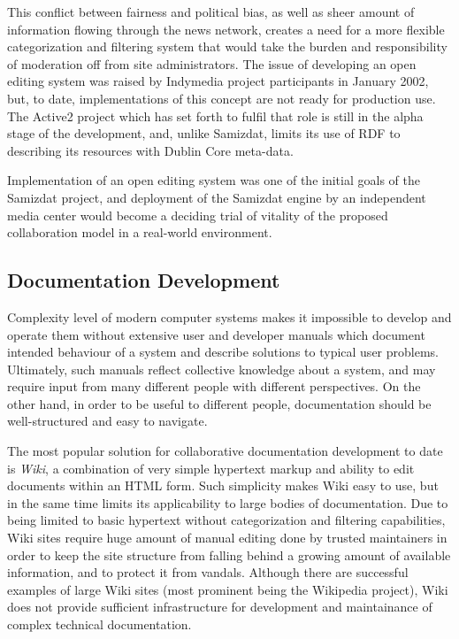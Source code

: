 \documentclass{llncs}
\begin{document}
This conflict between fairness and political bias, as well as sheer amount of
information flowing through the news network, creates a need for a more
flexible categorization and filtering system that would take the burden and
responsibility of moderation off from site administrators. The issue of
developing an open editing system was raised by Indymedia project participants
in January 2002, but, to date, implementations of this concept are not ready
for production use. The Active2 project\cite{active2} which has set forth to
fulfil that role is still in the alpha stage of the development, and, unlike
Samizdat, limits its use of RDF to describing its resources with Dublin Core
meta-data.

Implementation of an open editing system was one of the initial goals of the
Samizdat project\cite{oscom3}, and deployment of the Samizdat engine by an
independent media center would become a deciding trial of vitality of the
proposed collaboration model in a real-world environment.

\subsection{Documentation Development}

Complexity level of modern computer systems makes it impossible to develop and
operate them without extensive user and developer manuals which document
intended behaviour of a system and describe solutions to typical user
problems. Ultimately, such manuals reflect collective knowledge about a
system, and may require input from many different people with different
perspectives. On the other hand, in order to be useful to different people,
documentation should be well-structured and easy to navigate.

The most popular solution for collaborative documentation development to date
is \emph{Wiki}, a combination of very simple hypertext markup and ability to
edit documents within an HTML form. Such simplicity makes Wiki easy to use,
but in the same time limits its applicability to large bodies of
documentation. Due to being limited to basic hypertext without categorization
and filtering capabilities, Wiki sites require huge amount of manual editing
done by trusted maintainers in order to keep the site structure from falling
behind a growing amount of available information, and to protect it from
vandals. Although there are successful examples of large Wiki sites (most
prominent being the Wikipedia project), Wiki does not provide sufficient
infrastructure for development and maintainance of complex technical
documentation.
\end{document}
